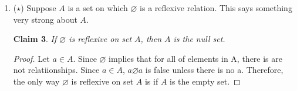 \documentclass[11pt]{letter}
\newtheorem{claim}{Claim}
\theoremstyle{definition}
\begin{document}
\begin{description}
\begin{enumerate}
\begin{enumerate}
			\item $I_B\circ R=R$ and $R\circ I_A=R$
                          \begin{claim}
                            $I_B\circ R=R$ and $R\circ I_A=R$
                          \end{claim}
                          \begin{proof}
                            Let $x\in I_B\circ R$.
                            So $x=(a,b)$ where $a\in A$ and $b\in B$.
                            Let $j\in R\circ I_A$. So $x=(m,n)$ where $m\in A$ and $n\in B$.
                          \end{proof}

			\item $\left(S\circ R\right)^{-1}=R^{-1}\circ S^{-1}$
                          \begin{claim}
                            $\left(S\circ R\right)^{-1}=R^{-1}\circ S^{-1}$
                          \end{claim}
                          \begin{proof}
                            Let $x\in \left(S\circ R\right)^{-1}$. Then $x=(m,n)$. So $(n,m)\in (S\circ R)$. So $n\in A$ and $m\in C$. Therefore $(m,n)\in R^{-1}\circ S^{-1}$ through inverses. So $x\in R^{-1}\circ S^{-1}$.\\
                            Let $h\in R^{-1}\circ S^{-1}$. So 
                          \end{proof}
                          
			\end{enumerate}

		      \item ($\star$) Suppose $A$ is a set on which $\varnothing$ is a reflexive relation. This says something very strong about $A$.
                        \begin{claim}
                          If $\varnothing$ is reflexive on set $A$, then $A$ is the null set.
                        \end{claim}
                        \begin{proof}
                          Let $a\in A$. Since $\varnothing$ implies that for all of elements in A, there is are not relatiionships. Since $a\in A$, $a\varnothing a$ is false unless there is no a. Therefore, the only way $\varnothing$ is reflexive on set $A$ is if $A$ is the empty set.  
                        \end{proof}
                        

\end{enumerate}
\end{description}
\end{document}
